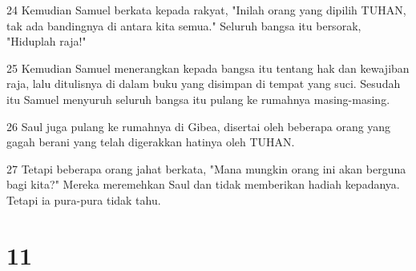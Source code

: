 \par 24 Kemudian Samuel berkata kepada rakyat, "Inilah orang yang dipilih TUHAN, tak ada bandingnya di antara kita semua." Seluruh bangsa itu bersorak, "Hiduplah raja!"
\par 25 Kemudian Samuel menerangkan kepada bangsa itu tentang hak dan kewajiban raja, lalu ditulisnya di dalam buku yang disimpan di tempat yang suci. Sesudah itu Samuel menyuruh seluruh bangsa itu pulang ke rumahnya masing-masing.
\par 26 Saul juga pulang ke rumahnya di Gibea, disertai oleh beberapa orang yang gagah berani yang telah digerakkan hatinya oleh TUHAN.
\par 27 Tetapi beberapa orang jahat berkata, "Mana mungkin orang ini akan berguna bagi kita?" Mereka meremehkan Saul dan tidak memberikan hadiah kepadanya. Tetapi ia pura-pura tidak tahu.

\chapter{11}

